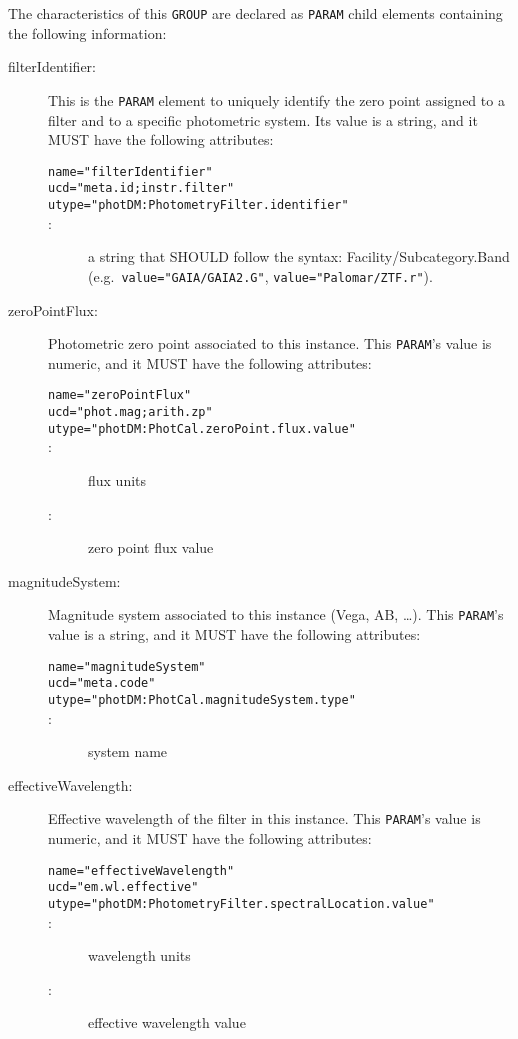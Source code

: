 \documentclass[11pt,a4paper]{ivoa} 
\let\fg=\color
\def\elem#1{{\tt{\fg{DarkRed}#1}}}
\def\attrval#1#2{{\tt{\fg{DarkRed}#1}="{\fg{DarkPurple}#2}"}}
\begin{document}
The characteristics of this \elem{GROUP} are declared as \elem{PARAM}
child elements
containing the following information:
\begin{description}
\item[filterIdentifier:] This is the \elem{PARAM} element to
  uniquely identify the zero point assigned to a filter and to a
  specific photometric system. Its value is a string, and it MUST
  have the following attributes:
\begin{description}
    \item[\attrval{name}{filterIdentifier}]
    \item[\attrval{ucd}{meta.id;instr.filter}]
    \item[\attrval{utype}{photDM:PhotometryFilter.identifier}]
    \item[:] a string that SHOULD follow the syntax:
      Facility/Subcategory.Band (e.g.\ \attrval{value}{GAIA/GAIA2.G},
      \attrval{value}{Palomar/ZTF.r}).
\end{description}
\item[zeroPointFlux:] Photometric zero point associated to this
  instance. This \elem{PARAM}'s value is numeric, and it MUST
  have the following attributes:
\begin{description}
    \item[\attrval{name}{zeroPointFlux}]
    \item[\attrval{ucd}{phot.mag;arith.zp}]
    \item[\attrval{utype}{photDM:PhotCal.zeroPoint.flux.value}]
    \item[:] flux units
    \item[:] zero point flux value
\end{description}
\item[magnitudeSystem:] Magnitude system associated to this
  instance (Vega, AB, \dots). This \elem{PARAM}'s value is a string,
  and it MUST have the
  following attributes:
\begin{description}
    \item[\attrval{name}{magnitudeSystem}]
    \item[\attrval{ucd}{meta.code}]
    \item[\attrval{utype}{photDM:PhotCal.magnitudeSystem.type}]
    \item[:] system name
\end{description}
\item[effectiveWavelength:] Effective wavelength of the filter
  in this instance. This \elem{PARAM}'s value is numeric,
  and it MUST have the following attributes:
\begin{description}
    \item[\attrval{name}{effectiveWavelength}]
    \item[\attrval{ucd}{em.wl.effective}]
    \item[\attrval{utype}{photDM:PhotometryFilter.spectralLocation.value}]
    \item[:] wavelength units
    \item[:] effective wavelength value
\end{description}
\end{description}
\end{document}
